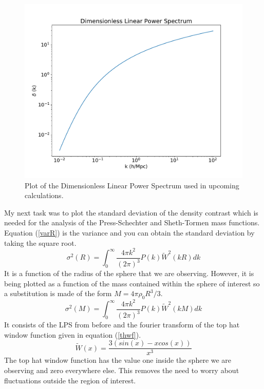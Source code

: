 \documentclass[12pt]{article}
\begin{document}
\begin{figure}[!ht]
    \centering
    \includegraphics[width=0.8\linewidth,keepaspectratio=false]{figures/DLPS.pdf}
    \caption{Plot of the Dimensionless Linear Power Spectrum used in upcoming calculations.}
    \label{dlpsFig}
\end{figure}

My next task was to plot the standard deviation of the density contrast which is needed for the analysis of the Press-Schechter  and Sheth-Tormen mass functions. Equation (\ref{varR}) is the variance and you can obtain the standard deviation by taking the square root.
\begin{equation} \label{varR}
\sigma^2(R) = \int_{0}^{\infty} \frac{4 \pi k^2}{(2 \pi)^3} P(k) \tilde{W}^2(kR) dk
\end{equation}
It is a function of the radius of the sphere that we are observing. However, it is being plotted as a function of the mass contained within the sphere of interest so a substitution is made of the form $M = 4 \pi \rho_0 R^3 / 3$.
\begin{equation} \label{varM}
\sigma^2(M) = \int_{0}^{\infty} \frac{4 \pi k^2}{(2 \pi)^3} P(k) \tilde{W}^2(kM) dk
\end{equation} 
It consists of the LPS from before and the fourier transform of the top hat window function given in equation (\ref{thwf}).
\begin{equation}\label{thwf}
\tilde{W}(x) = \frac{3(sin(x) - xcos(x))}{x^3}
\end{equation}
The top hat window function has the value one inside the sphere we are observing and zero everywhere else. This removes the need to worry about fluctuations outside the region of interest.
\end{document}
